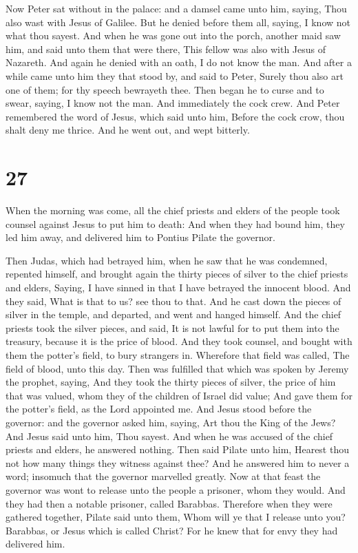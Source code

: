  Now Peter sat without in the palace: and a damsel came
unto him, saying, Thou also wast with Jesus of Galilee. 
But he denied before them all, saying, I know not what thou sayest.
 And when he was gone out into the porch, another maid saw
him, and said unto them that were there, This fellow was also with Jesus
of Nazareth.  And again he denied with an oath, I do not
know the man.  And after a while came unto him they that
stood by, and said to Peter, Surely thou also art one of them; for thy
speech bewrayeth thee.  Then began he to curse and to
swear, saying, I know not the man. And immediately the cock crew.
 And Peter remembered the word of Jesus, which said unto
him, Before the cock crow, thou shalt deny me thrice. And he went out,
and wept bitterly.

\hypertarget{section-26}{%
\section{27}\label{section-26}}

 When the morning was come, all the chief priests and elders
of the people took counsel against Jesus to put him to death:
 And when they had bound him, they led him away, and
delivered him to Pontius Pilate the governor.

 Then Judas, which had betrayed him, when he saw that he
was condemned, repented himself, and brought again the thirty pieces of
silver to the chief priests and elders,  Saying, I have
sinned in that I have betrayed the innocent blood. And they said, What
is that to us? see thou to that.  And he cast down the
pieces of silver in the temple, and departed, and went and hanged
himself.  And the chief priests took the silver pieces, and
said, It is not lawful for to put them into the treasury, because it is
the price of blood.  And they took counsel, and bought with
them the potter's field, to bury strangers in.  Wherefore
that field was called, The field of blood, unto this day. 
Then was fulfilled that which was spoken by Jeremy the prophet, saying,
And they took the thirty pieces of silver, the price of him that was
valued, whom they of the children of Israel did value;  And
gave them for the potter's field, as the Lord appointed me.
 And Jesus stood before the governor: and the governor
asked him, saying, Art thou the King of the Jews? And Jesus said unto
him, Thou sayest.  And when he was accused of the chief
priests and elders, he answered nothing.  Then said Pilate
unto him, Hearest thou not how many things they witness against thee?
 And he answered him to never a word; insomuch that the
governor marvelled greatly.  Now at that feast the governor
was wont to release unto the people a prisoner, whom they would.
 And they had then a notable prisoner, called Barabbas.
 Therefore when they were gathered together, Pilate said
unto them, Whom will ye that I release unto you? Barabbas, or Jesus
which is called Christ?  For he knew that for envy they had
delivered him.

